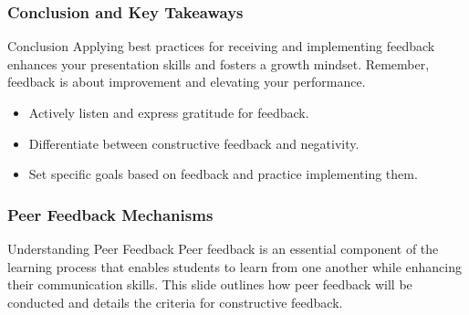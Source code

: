 \documentclass[aspectratio=169]{beamer}
\begin{document}
\begin{frame}[fragile]
    \frametitle{Conclusion and Key Takeaways}
    \begin{block}{Conclusion}
        Applying best practices for receiving and implementing feedback enhances your presentation skills and fosters a growth mindset. 
        Remember, feedback is about improvement and elevating your performance.
    \end{block}
    \begin{itemize}
        \item Actively listen and express gratitude for feedback.
        \item Differentiate between constructive feedback and negativity.
        \item Set specific goals based on feedback and practice implementing them.
    \end{itemize}
\end{frame}

\begin{frame}[fragile]
    \frametitle{Peer Feedback Mechanisms}
    \begin{block}{Understanding Peer Feedback}
        Peer feedback is an essential component of the learning process that enables students to learn from one another while enhancing their communication skills. This slide outlines how peer feedback will be conducted and details the criteria for constructive feedback.
    \end{block}
\end{frame}
\end{document}
